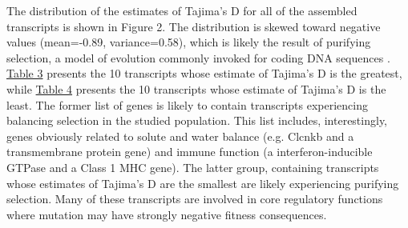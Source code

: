 \documentclass[12pt]{article}
\begin{document}
The distribution of the estimates of Tajima's D for all of the assembled transcripts is shown in Figure 2. The distribution is skewed toward negative values (mean=-0.89, variance=0.58), which is likely the result of purifying selection, a model of evolution commonly invoked for coding DNA sequences \citep{Chamary:2006db}. \hyperlink{Table 3}{Table 3} presents the 10 transcripts whose estimate of Tajima's D is the greatest, while \hyperlink{Table 4}{Table 4} presents the 10 transcripts whose estimate of Tajima's D is the least. The former list of genes is likely to contain transcripts experiencing balancing selection in the studied population. This list includes, interestingly, genes obviously related to solute and water balance (e.g. Clcnkb and a transmembrane protein gene) and immune function (a interferon-inducible GTPase and a Class 1 MHC gene). The latter group, containing transcripts whose estimates of Tajima's D are the smallest are likely experiencing purifying selection. Many of these transcripts are involved in core regulatory functions where mutation may have strongly negative fitness consequences. \\

\vspace{10mm}
\end{document}
